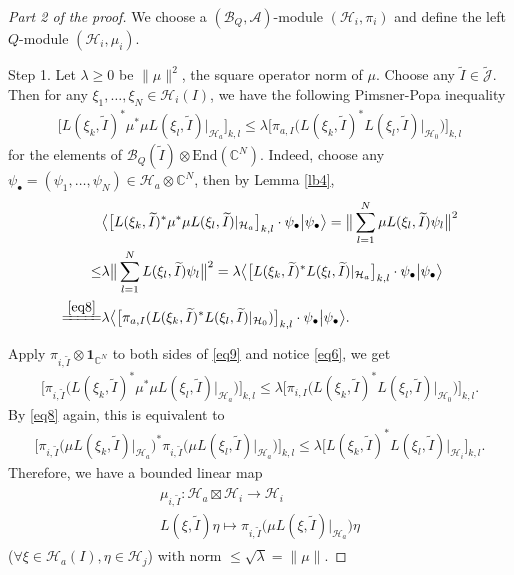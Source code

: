 \documentclass[11pt,b5paper,notitlepage]{article}
\theoremstyle{definition}
\theoremstyle{plain}
\newcommand{\mc}{\mathcal}
\newcommand{\wtd}{\widetilde}
\newcommand{\End}{\mathrm{End}} %
\newcommand{\id}{\mathbf{1}}
\newcommand{\Jtd}{\widetilde{\mathcal J}}
\newcommand{\blt}{\bullet}
\newcommand{\Cbb}{\mathbb C}
\numberwithin{equation}{section}
\begin{document}
\begin{proof}[Part 2 of the proof]
We choose a $(\mc B_Q,\mc A)$-module $(\mc H_i,\pi_i)$ and define the left $Q$-module $(\mc H_i,\mu_i)$.

Step 1. Let $\lambda\geq 0$ be $\lVert\mu\lVert^2$, the square operator norm of $\mu$. Choose any $\wtd I\in\Jtd$. Then for any $\xi_1,\dots,\xi_N\in\mc H_i(I)$, we have the following Pimsner-Popa inequality
\begin{align}
\Big[L(\xi_k,\wtd I)^*\mu^*\mu L(\xi_l,\wtd I)\big|_{\mc H_a}\Big]_{k,l}\leq \lambda \Big[\pi_{a,I}\big(L(\xi_k,\wtd I)^*L(\xi_l,\wtd I)\big|_{\mc H_0}\big)\Big]_{k,l}	\label{eq9}
\end{align}
for the elements of $\mc B_Q(\wtd I)\otimes \End(\Cbb^N)$. Indeed, choose any $\psi_\blt=(\psi_1,\dots,\psi_N)\in\mc H_a\otimes\Cbb^N$, then by Lemma \ref{lb4},
\begin{align*}
&\big\langle \big[L(\xi_k,\wtd I)^*\mu^*\mu L(\xi_l,\wtd I)|_{\mc H_a}\big]_{k,l}\cdot \psi_\blt\big|\psi_\blt \big\rangle	=\big\lVert \sum_{l=1}^N \mu L(\xi_l,\wtd I)\psi_l \big\lVert^2\\
\leq&\lambda\big\lVert \sum_{l=1}^N L(\xi_l,\wtd I)\psi_l \big\lVert^2=\lambda\big\langle \big[L(\xi_k,\wtd I)^*L(\xi_l,\wtd I)|_{\mc H_a}\big]_{k,l}\cdot \psi_\blt\big|\psi_\blt \big\rangle\\
\xlongequal{\eqref{eq8}}&\lambda\big\langle \big[\pi_{a,I}(L(\xi_k,\wtd I)^*L(\xi_l,\wtd I)|_{\mc H_0})\big]_{k,l}\cdot \psi_\blt\big|\psi_\blt \big\rangle.
\end{align*}


Apply $\pi_{i,\wtd I}\otimes\id_{\Cbb^N}$ to both sides of \eqref{eq9} and notice \eqref{eq6}, we get
\begin{align*}
\Big[\pi_{i,\wtd I}\big(L(\xi_k,\wtd I)^*\mu^*\mu L(\xi_l,\wtd I)\big|_{\mc H_a}\big)\Big]_{k,l}\leq \lambda \Big[\pi_{i,I}\big(L(\xi_k,\wtd I)^*L(\xi_l,\wtd I)\big|_{\mc H_0}\big)\Big]_{k,l}.
\end{align*}
By \eqref{eq8} again, this is equivalent to
\begin{align}
	\Big[\pi_{i,\wtd I}\big(\mu L(\xi_k,\wtd I)\big|_{\mc H_a}\big)^*\pi_{i,\wtd I}\big(\mu L(\xi_l,\wtd I)\big|_{\mc H_a}\big)\Big]_{k,l}\leq \lambda \Big[L(\xi_k,\wtd I)^*L(\xi_l,\wtd I)\big|_{\mc H_i}\Big]_{k,l}.
\end{align}
Therefore, we have a bounded linear map
\begin{gather}\label{eq10}
\begin{gathered}
\mu_{i,\wtd I}:\mc H_a\boxtimes\mc H_i\rightarrow\mc H_i\\
L(\xi,\wtd I)\eta\mapsto \pi_{i,\wtd I}\big(\mu L(\xi,\wtd I)\big|_{\mc H_a}\big)\eta
\end{gathered}	
\end{gather}
($\forall\xi\in\mc H_a(I),\eta\in\mc H_j$) with norm $\leq \sqrt{\lambda}=\lVert\mu\lVert$.


\end{proof}
\end{document}
